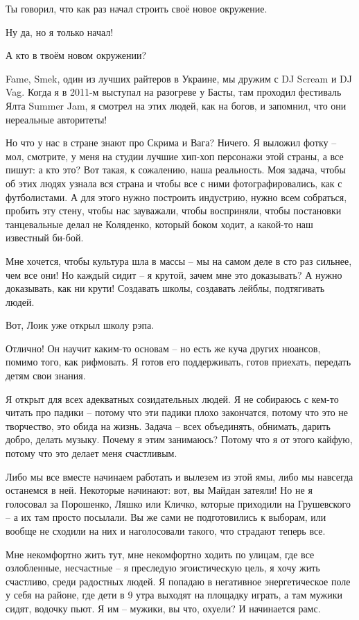 Ты говорил, что как раз начал строить своё новое окружение.

Ну да, но я только начал!

А кто в твоём новом окружении?

Fame, Smek, один из лучших райтеров в Украине, мы дружим с DJ Scream и DJ Vag.
Когда я в 2011-м выступал на разогреве у Басты, там проходил фестиваль Ялта
Summer Jam, я смотрел на этих людей, как на богов, и запомнил, что они
нереальные авторитеты!

Но что у нас в стране знают про Скрима и Вага? Ничего. Я выложил фотку – мол,
смотрите, у меня на студии лучшие хип-хоп персонажи этой страны, а все пишут: а
кто это? Вот такая, к сожалению, наша реальность. Моя задача, чтобы об этих
людях узнала вся страна и чтобы все с ними фотографировались, как с
футболистами. А для этого нужно построить индустрию, нужно всем собраться,
пробить эту стену, чтобы нас зауважали, чтобы восприняли, чтобы постановки
танцевальные делал не Коляденко, который боком ходит, а какой-то наш известный
би-бой.  

Мне хочется, чтобы культура шла в массы – мы на самом деле в сто раз сильнее,
чем все они! Но каждый сидит – я крутой, зачем мне это доказывать? А нужно
доказывать, как ни крути! Создавать школы, создавать лейблы, подтягивать людей. 

Вот, Лоик уже открыл школу рэпа.

Отлично! Он научит каким-то основам – но есть же куча других нюансов, помимо
того, как рифмовать. Я готов его поддерживать, готов приехать, передать детям
свои знания.  

Я открыт для всех адекватных созидательных людей. Я не собираюсь с кем-то
читать про падики – потому что эти падики плохо закончатся, потому что это не
творчество, это обида на жизнь. Задача – всех объединять, обнимать, дарить
добро, делать музыку. Почему я этим занимаюсь? Потому что я от этого кайфую,
потому что это делает меня счастливым.

Либо мы все вместе начинаем работать и вылезем из этой ямы, либо мы навсегда
останемся в ней. Некоторые начинают: вот, вы Майдан затеяли! Но не я голосовал
за Порошенко, Ляшко или Кличко, которые приходили на Грушевского – а их там
просто посылали. Вы же сами не подготовились к выборам, или вообще не сходили
на них и наголосовали такого, что страдают теперь все.

Мне некомфортно жить тут, мне некомфортно ходить по улицам, где все
озлобленные, несчастные – я преследую эгоистическую цель, я хочу жить
счастливо, среди радостных людей. Я попадаю в негативное энергетическое  поле у
себя на районе, где дети в 9 утра выходят на площадку играть, а там мужики
сидят, водочку пьют. Я им – мужики, вы что, охуели? И начинается рамс.

